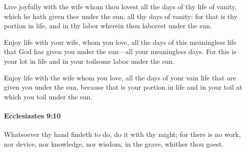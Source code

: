 			\begin{versebox}
					\item[BHS] 
					\item[LXX] 
					\item[ASV] Live joyfully with the wife whom thou lovest all the days of thy life of vanity, which he hath given thee under the sun, all thy days of vanity: for that is thy portion in life, and in thy labor wherein thou laborest under the sun.
					\item[NIV] Enjoy life with your wife, whom you love, all the days of this meaningless life that God has given you under the sun—all your meaningless days. For this is your lot in life and in your toilsome labor under the sun.
					\item[NRSV] Enjoy life with the wife whom you love, all the days of your vain life that are given you under the sun, because that is your portion in life and in your toil at which you toil under the sun.
			\end{versebox}

		\paragraph{Ecclesiastes 9:10} %
			\label{ECCLESIASTES-9-10}

			Whatsoever thy hand findeth to do, do it with thy might; for there is no work, nor device, nor knowledge, nor wisdom, in the grave, whither thou goest.

